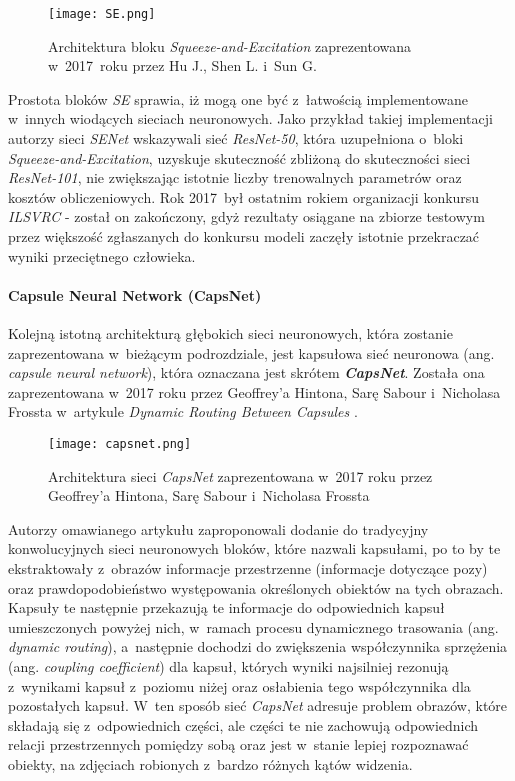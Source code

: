 \begin{figure}[!h]
    \centering \texttt{[image: SE.png]}
    \captionsetup{format=hang}
    \caption{Architektura bloku \emph{Squeeze-and-Excitation} zaprezentowana w~2017~roku przez Hu J., Shen L. i~Sun G.\cite{hu}}
    \label{fig:se1}
\end{figure}

Prostota bloków \emph{SE} sprawia, iż mogą one być z~łatwością implementowane w~innych wiodących sieciach neuronowych. Jako przykład takiej implementacji autorzy sieci \emph{SENet} wskazywali sieć \emph{ResNet-50}, która uzupełniona o~bloki \emph{Squeeze-and-Excitation}, uzyskuje skuteczność zbliżoną do skuteczności sieci \emph{ResNet-101}, nie zwiększając istotnie liczby trenowalnych parametrów oraz kosztów obliczeniowych. Rok 2017~był ostatnim rokiem organizacji konkursu \emph{ILSVRC}  - został on zakończony, gdyż rezultaty osiągane na zbiorze testowym przez większość zgłaszanych do konkursu modeli zaczęły istotnie przekraczać wyniki przeciętnego człowieka.

\paragraph*{Capsule Neural Network (CapsNet)}

Kolejną istotną architekturą głębokich sieci neuronowych, która zostanie zaprezentowana w~bieżącym podrozdziale, jest kapsułowa sieć neuronowa (ang. \emph{capsule neural network}), która oznaczana jest skrótem \textbf{\emph{CapsNet}}. Została ona zaprezentowana w~2017 roku przez Geoffrey'a Hintona, Sarę Sabour i~Nicholasa Frossta w~artykule \emph{Dynamic Routing Between Capsules} \cite{hinton2}.

\begin{figure}[!h]
    \centering \texttt{[image: capsnet.png]}
    \captionsetup{format=hang}
    \caption{Architektura sieci \emph{CapsNet} zaprezentowana w~2017 roku przez Geoffrey'a Hintona, Sarę Sabour i~Nicholasa Frossta \cite{hinton2}}
    \label{fig:capsnet1}
\end{figure}

Autorzy omawianego artykułu zaproponowali dodanie do tradycyjny konwolucyjnych sieci neuronowych bloków, które nazwali kapsułami, po to by te ekstraktowały z~obrazów informacje przestrzenne (informacje dotyczące pozy) oraz prawdopodobieństwo występowania określonych obiektów na tych obrazach. Kapsuły te następnie przekazują te informacje do odpowiednich kapsuł umieszczonych powyżej nich, w~ramach procesu dynamicznego trasowania (ang. \emph{dynamic routing}), a~następnie dochodzi do zwiększenia współczynnika sprzężenia (ang. \emph{coupling coefficient}) dla kapsuł, których wyniki najsilniej rezonują z~wynikami kapsuł z~poziomu niżej oraz osłabienia tego współczynnika dla pozostałych kapsuł. W~ten sposób sieć \emph{CapsNet} adresuje problem obrazów, które składają się z~odpowiednich części, ale części te nie zachowują odpowiednich relacji przestrzennych pomiędzy sobą oraz jest w~stanie lepiej rozpoznawać obiekty, na zdjęciach robionych z~bardzo różnych kątów widzenia.


